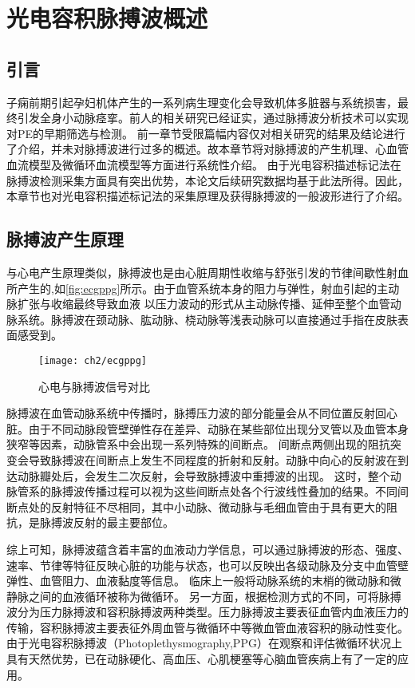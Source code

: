 \chapter{光电容积脉搏波概述}
\section{引言}
子痫前期引起孕妇机体产生的一系列病生理变化会导致机体多脏器与系统损害，最终引发全身小动脉痉挛。前人的相关研究已经证实，通过脉搏波分析技术可以实现对PE的早期筛选与检测。
前一章节受限篇幅内容仅对相关研究的结果及结论进行了介绍，并未对脉搏波进行过多的概述。故本章节将对脉搏波的产生机理、心血管血流模型及微循环血流模型等方面进行系统性介绍。
由于光电容积描述标记法在脉搏波检测采集方面具有突出优势，本论文后续研究数据均基于此法所得。因此，本章节也对光电容积描述标记法的采集原理及获得脉搏波的一般波形进行了介绍。
\section{脉搏波产生原理}
与心电产生原理类似，脉搏波也是由心脏周期性收缩与舒张引发的节律间歇性射血所产生的\cite{Allen2007},如\autoref{fig:ecgppg}所示。由于血管系统本身的阻力与弹性，射血引起的主动脉扩张与收缩最终导致血液
以压力波动的形式从主动脉传播、延伸至整个血管动脉系统。脉搏波在颈动脉、肱动脉、桡动脉等浅表动脉可以直接通过手指在皮肤表面感受到\cite{PPGYY}。
\begin{figure}[htbp]
    \centering
    \texttt{[image: ch2/ecgppg]}
    \caption{\label{fig:ecgppg}心电与脉搏波信号对比}
\end{figure}

脉搏波在血管动脉系统中传播时，脉搏压力波的部分能量会从不同位置反射回心脏。由于不同动脉段管壁弹性存在差异、动脉在某些部位出现分叉管以及血管本身狭窄等因素，动脉管系中会出现一系列特殊的间断点。
间断点两侧出现的阻抗突变会导致脉搏波在间断点上发生不同程度的折射和反射。动脉中向心的反射波在到达动脉瓣处后，会发生二次反射，会导致脉搏波中重搏波的出现。
这时，整个动脉管系的脉搏波传播过程可以视为这些间断点处各个行波线性叠加的结果。不同间断点处的反射特征不尽相同，其中小动脉、微动脉与毛细血管由于具有更大的阻抗，是脉搏波反射的最主要部位。

综上可知，脉搏波蕴含着丰富的血液动力学信息，可以通过脉搏波的形态、强度、速率、节律等特征反映心脏的功能与状态，也可以反映出各级动脉及分支中血管壁弹性、血管阻力、血液黏度等信息。
临床上一般将动脉系统的末梢的微动脉和微静脉之间的血液循环被称为微循环。
另一方面，根据检测方式的不同，可将脉搏波分为压力脉搏波和容积脉搏波两种类型。压力脉搏波主要表征血管内血液压力的传输，容积脉搏波主要表征外周血管与微循环中等微血管血液容积的脉动性变化。
由于光电容积脉搏波（Photoplethysmography,PPG）在观察和评估微循环状况上具有天然优势，已在动脉硬化、高血压、心肌梗塞等心脑血管疾病上有了一定的应用\cite{PPGYY,Allen2007,THOCBPM}。
